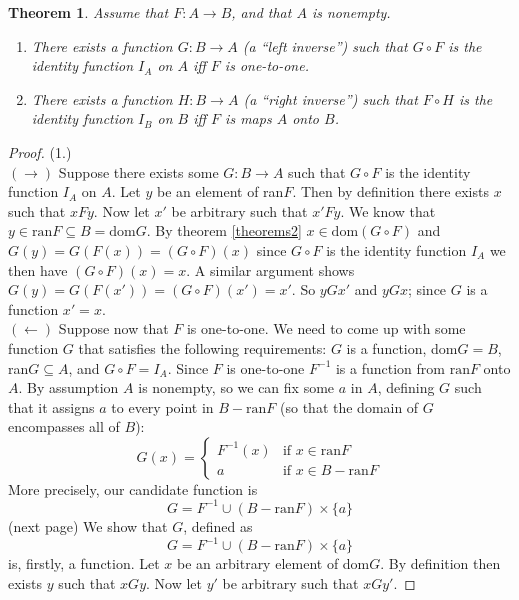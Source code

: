 \documentclass{report}
\newtheorem{theorem}[theo]{Theorem}
\begin{document}
\begin{theorem}
Assume that $F:A\to B$, and that $A$ is nonempty.
\begin{enumerate}
\item There exists a function $G:B\to A$ (a ``left inverse'') such that $G\circ F$ is the identity function $I_A$ on $A$ iff $F$ is one-to-one.
\item There exists a function $H:B\to A$ (a ``right inverse'') such that $F\circ H$ is the identity function $I_B$ on $B$ iff $F$ is maps $A$ onto $B$.
\end{enumerate}
\end{theorem}
\begin{proof}(1.)\\
\indent$(\rightarrow)$ Suppose there exists some $G:B\to A$ such that $G\circ F$ is the identity function $I_A$ on $A$. Let $y$ be an element of ran$F$.
Then by definition there exists $x$ such that $xFy$. Now let $x'$ be arbitrary such that $x'Fy$.
We know that $y\in\text{ran}F\subseteq B=\text{dom}G$. By theorem \ref{theorems2} $x\in\text{dom}(G\circ F)$ and $G(y)=G(F(x))=(G\circ F)(x)$ since 
$G\circ F$ is the identity function $I_A$ we then have $(G\circ F)(x)=x$. A similar argument 
shows $G(y)=G(F(x'))=(G\circ F)(x')=x'$. So $yGx'$ and $yGx$; since $G$ is a function $x'=x$.\\
\indent $(\leftarrow)$ Suppose now that $F$ is one-to-one. We need to come up with some function $G$ that satisfies the following requirements: $G$ is a function, dom$G=B$, ran$G\subseteq A$, and 
$G\circ F=I_A$. Since $F$ is one-to-one $F^{-1}$ is a function from $\text{ran}F$ onto $A$. By assumption $A$ is nonempty, so we can fix some $a$ in $A$, defining $G$ such that it assigns $a$ to 
every point in $B-\text{ran}F$ (so that the domain of $G$ encompasses all of $B$):
\begin{equation*}
G(x)=\begin{cases}
F^{-1}(x)&\text{if }x\in\text{ran}F\\
a&\text{if }x\in B-\text{ran}F
\end{cases}
\end{equation*}
More precisely, our candidate function is
\begin{equation*}
G=F^{-1}\cup(B-\text{ran}F)\times\{a\}
\end{equation*}
(next page)\newpage
We show that $G$, defined as
\begin{equation*}
G=F^{-1}\cup(B-\text{ran}F)\times\{a\}
\end{equation*}
is, firstly, a function. Let $x$ be an arbitrary element of dom$G$. By definition then exists $y$ such that $xGy$. Now let $y'$ be arbitrary such that $xGy'$.

\end{proof}
\end{document}
